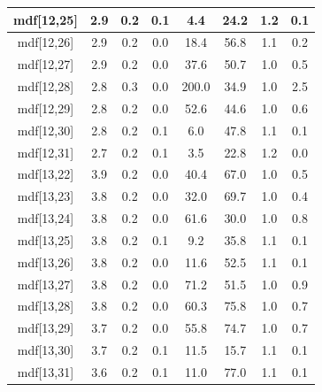 \begin{longtable}{|c|c|c|c|c|c|c|c|}
\hline
mdf[12,25] & 2.9 & 0.2 & 0.1 & 4.4 & 24.2 & 1.2 & 0.1 \\
\hline
mdf[12,26] & 2.9 & 0.2 & 0.0 & 18.4 & 56.8 & 1.1 & 0.2 \\
\hline
mdf[12,27] & 2.9 & 0.2 & 0.0 & 37.6 & 50.7 & 1.0 & 0.5 \\
\hline
mdf[12,28] & 2.8 & 0.3 & 0.0 & 200.0 & 34.9 & 1.0 & 2.5 \\
\hline
mdf[12,29] & 2.8 & 0.2 & 0.0 & 52.6 & 44.6 & 1.0 & 0.6 \\
\hline
mdf[12,30] & 2.8 & 0.2 & 0.1 & 6.0 & 47.8 & 1.1 & 0.1 \\
\hline
mdf[12,31] & 2.7 & 0.2 & 0.1 & 3.5 & 22.8 & 1.2 & 0.0 \\
\hline
mdf[13,22] & 3.9 & 0.2 & 0.0 & 40.4 & 67.0 & 1.0 & 0.5 \\
\hline
mdf[13,23] & 3.8 & 0.2 & 0.0 & 32.0 & 69.7 & 1.0 & 0.4 \\
\hline
mdf[13,24] & 3.8 & 0.2 & 0.0 & 61.6 & 30.0 & 1.0 & 0.8 \\
\hline
mdf[13,25] & 3.8 & 0.2 & 0.1 & 9.2 & 35.8 & 1.1 & 0.1 \\
\hline
mdf[13,26] & 3.8 & 0.2 & 0.0 & 11.6 & 52.5 & 1.1 & 0.1 \\
\hline
mdf[13,27] & 3.8 & 0.2 & 0.0 & 71.2 & 51.5 & 1.0 & 0.9 \\
\hline
mdf[13,28] & 3.8 & 0.2 & 0.0 & 60.3 & 75.8 & 1.0 & 0.7 \\
\hline
mdf[13,29] & 3.7 & 0.2 & 0.0 & 55.8 & 74.7 & 1.0 & 0.7 \\
\hline
mdf[13,30] & 3.7 & 0.2 & 0.1 & 11.5 & 15.7 & 1.1 & 0.1 \\
\hline
mdf[13,31] & 3.6 & 0.2 & 0.1 & 11.0 & 77.0 & 1.1 & 0.1 \\
\hline
\end{longtable}
